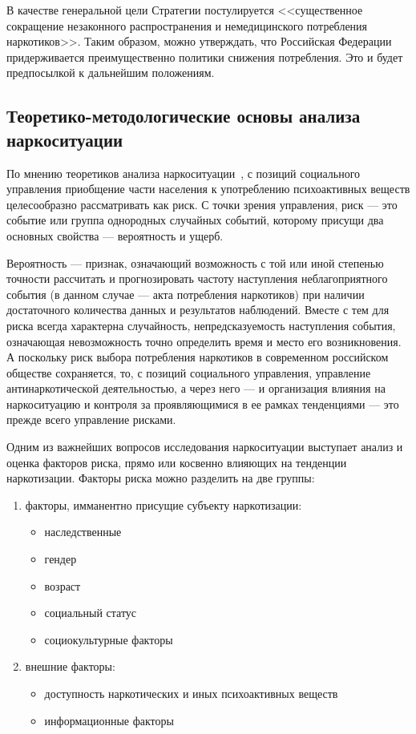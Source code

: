 В качестве генеральной цели Стратегии постулируется <<существенное сокращение 
незаконного распространения и немедицинского потребления наркотиков>>. Таким 
образом, можно утверждать, что Российская Федерации придерживается 
преимущественно политики снижения потребления. Это и будет предпосылкой к 
дальнейшим положениям.

\subsection{Теоретико-методологические основы анализа наркоситуации}

По мнению теоретиков анализа наркоситуации~\cite{Karpets2010}, с позиций
социального управления приобщение части населения к употреблению психоактивных
веществ целесообразно рассматривать как риск. С точки зрения управления, риск
–-- это событие или группа однородных случайных событий, которому присущи два
основных свойства --– вероятность и ущерб.

Вероятность –-- признак, означающий возможность с той или иной степенью точности
рассчитать и прогнозировать частоту наступления неблагоприятного события (в
данном случае --– акта потребления наркотиков) при наличии достаточного
количества данных и результатов наблюдений. Вместе с тем для риска всегда
характерна случайность, непредсказуемость наступления события, означающая
невозможность точно определить время и место его возникновения. А поскольку риск
выбора потребления наркотиков в современном российском обществе сохраняется, то,
с позиций социального управления, управление антинаркотической деятельностью, а
через него –-- и организация влияния на наркоситуацию и контроля за
проявляющимися в ее рамках тенденциями –-- это прежде всего управление рисками.

Одним из важнейших вопросов исследования наркоситуации выступает анализ и
оценка факторов риска, прямо или косвенно влияющих на тенденции наркотизации. 
Факторы риска можно разделить на две группы:
\begin{enumerate}
    \item факторы, имманентно присущие субъекту наркотизации:
        \begin{itemize}
            \item наследственные
            \item гендер
            \item возраст
            \item социальный статус
            \item социокультурные факторы
        \end{itemize}
    \item внешние факторы:
        \begin{itemize}
            \item доступность наркотических и иных психоактивных веществ
            \item информационные факторы	
        \end{itemize}
\end{enumerate}	

